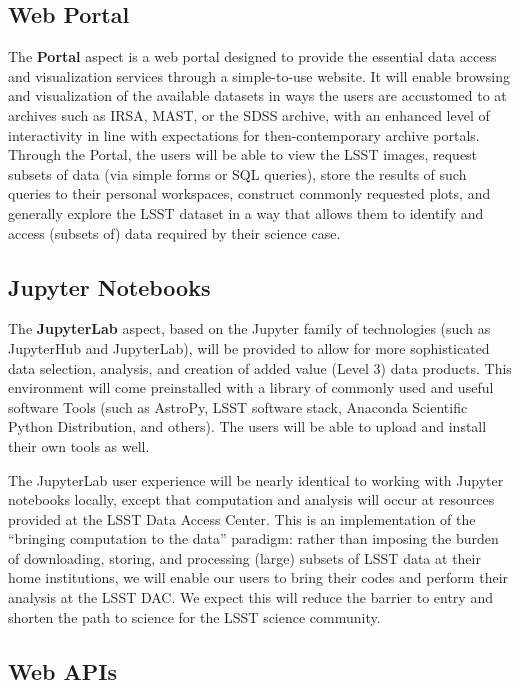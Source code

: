 \documentclass[DM,lsstdraft,toc]{lsstdoc}
\begin{document}
\subsection{Web Portal}

The {\bf Portal} aspect is a web portal designed to provide the essential data
access and visualization services through a simple-to-use website.  It will
enable browsing and visualization of the available datasets in ways the
users are accustomed to at archives such as IRSA, MAST, or the SDSS archive,
with an enhanced level of interactivity in line with expectations for
then-contemporary archive portals.  Through the Portal, the users will be
able to view the LSST images, request subsets of data (via simple forms or
SQL queries), store the results of such queries to their personal
workspaces, construct commonly requested plots, and generally explore the
LSST dataset in a way that allows them to identify and access (subsets of)
data required by their science case.

\subsection{Jupyter Notebooks}

The {\bf JupyterLab} aspect, based on the Jupyter family of technologies (such as
JupyterHub and JupyterLab), will be provided to allow for more sophisticated
data selection, analysis, and creation of added value (Level 3) data
products.  This environment will come preinstalled with a library of
commonly used and useful software Tools (such as AstroPy, LSST software
stack, Anaconda Scientific Python Distribution, and others).  The users will
be able to upload and install their own tools as well.

The JupyterLab user experience will be nearly identical to working with
Jupyter notebooks locally, except that computation and analysis will occur
at resources provided at the LSST Data Access Center.  This is an
implementation of the “bringing computation to the data” paradigm: rather
than imposing the burden of downloading, storing, and processing (large)
subsets of LSST data at their home institutions, we will enable our users to
bring their codes and perform their analysis at the LSST DAC.  We expect
this will reduce the barrier to entry and shorten the path to science for
the LSST science community.

\subsection{Web APIs}
\end{document}
